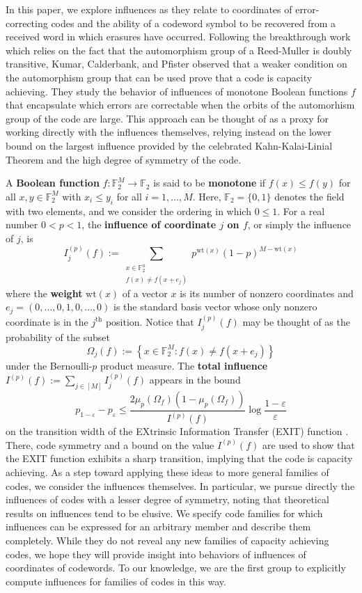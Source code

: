 \documentclass[12pt]{article}
\newcommand{\F}{\mathbb{F}}
\newcommand{\wt}{\mathrm{wt}}
\def\F{\mathbb F}
\theoremstyle{definition}
\begin{document}
In this paper, we explore influences as they relate to coordinates of error-correcting codes and the ability of a codeword symbol to be recovered from a received word in which erasures have occurred.  Following the breakthrough work \cite{Kudekar_17}
which  relies on the fact that the automorphism group of a Reed-Muller is doubly transitive, Kumar, Calderbank, and Pfister 
\cite{Kumar_16} observed that a weaker condition on the automorphism group that can be used prove that a code is capacity achieving. They study the behavior of influences of monotone Boolean functions $f$ that encapsulate which errors are correctable when the orbits of the automorhism group of the code are large. This approach can be thought of as a proxy for working directly with the influences themselves, relying instead on the lower bound on the largest influence provided by the celebrated Kahn-Kalai-Linial Theorem \cite{KKL_88} and the high degree of symmetry of the code. 

A {\bf Boolean function} $f\colon \F_2^M \rightarrow \F_2$ is said to be {\bf monotone} if $f(x) \leq f(y)$  for all $x, y \in \F_2^M$ with $x_i \leq y_i$ for all $i=1, \dots, M$. Here, $\F_2=\{ 0 , 1 \}$ denotes the field with two elements, and we consider the ordering in which $0 \leq 1$. For a real number $0<p<1$, the {\bf influence of coordinate $j$ on $f$}, or simply the influence of $j$, is 
$$
I_j^{(p)}(f) := \sum_{\substack{x \in \F_2^n\\ f(x) \neq f(x+e_j)}} p^{\wt(x)}(1-p)^{M-\wt(x)}
$$
where the {\bf weight} $\wt(x)$  of a vector $x$ is its number of nonzero coordinates and $e_j=(0, \dots, 0, 1, 0, \dots, 0)$ is the standard basis vector whose only nonzero coordinate is in the $j^\text{th}$ position. Notice that $I_j^{(p)}(f)$ may be thought of as the probability of the subset
$$\Omega_j(f):=\left\{ x \in \F_2^M\colon f(x) \neq f(x+e_j) \right\}$$
under
the Bernoulli-$p$ product measure. The {\bf total influence} $I^{(p)}(f):=\sum_{j \in [M]} I_j^{(p)}(f)$ appears in the bound
$$
p_{1-\varepsilon} - p_{\varepsilon} \leq \frac{2\mu_p (\Omega_f) (1-\mu_p (\Omega_f))}{I^{(p)}(f)} \log \frac{1-\varepsilon}{\varepsilon}
$$
on the transition width of the EXtrinsic Information Transfer (EXIT) function \cite{Kudekar_17}. There, code symmetry and a bound on the value $I^{(p)}(f)$ are used to show that the EXIT function exhibits a sharp transition, implying that the code is capacity achieving. As a step toward applying these ideas to more general families of codes, we consider the influences themselves. In particular, we pursue directly the influences of codes with a lesser degree of symmetry, noting that theoretical results on influences tend to be elusive. We specify code families for which influences can be expressed for an arbitrary member and describe them completely. While they do not reveal any new families of capacity achieving codes, we hope they will provide insight into behaviors of influences of coordinates of codewords. To our knowledge, we are the first group to explicitly compute influences for families of codes in this way. 
\end{document}
